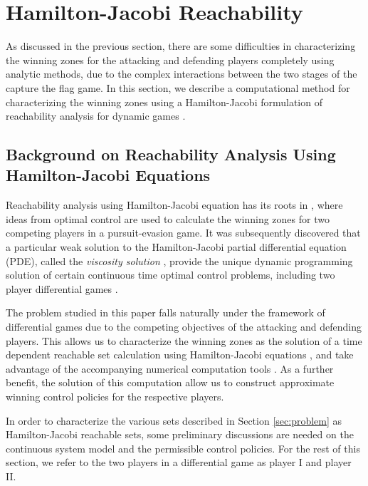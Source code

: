\section{Hamilton-Jacobi Reachability}
\label{sec:hj_formulation}

As discussed in the previous section, there are some difficulties in characterizing the winning zones for the attacking and defending players completely using analytic methods, due to the complex interactions between the two stages of the capture the flag game.  In this section, we describe a computational method for characterizing the winning zones using a Hamilton-Jacobi formulation of reachability analysis for dynamic games \cite{j:mitchell-TAC-2005}.

\subsection{Background on Reachability Analysis Using Hamilton-Jacobi Equations}
\label{subsec:hj_background}

Reachability analysis using Hamilton-Jacobi equation has its roots in \cite{b:isaacs-1967}, where ideas from optimal control are used to calculate the winning zones for two competing players in a pursuit-evasion game.  It was subsequently discovered that a particular weak solution to the Hamilton-Jacobi partial differential equation (PDE), called the \emph{viscosity solution} \cite{j:Crandall-TAMS-1983}, provide the unique dynamic programming solution of certain continuous time optimal control problems, including two player differential games \cite{j:Evans-IUMJ-1984,b:bardi-1997}.  

The problem studied in this paper falls naturally under the framework of differential games due to the competing objectives of the attacking and defending players.  This allows us to characterize the winning zones as the solution of a time dependent reachable set calculation using Hamilton-Jacobi equations \cite{j:mitchell-TAC-2005}, and take advantage of the accompanying numerical computation tools \cite{j:mitchell-jsc-2008}.  As a further benefit, the solution of this computation allow us to construct approximate winning control policies for the respective players.

In order to characterize the various sets described in Section \ref{sec:problem} as Hamilton-Jacobi reachable sets, some preliminary discussions are needed on the continuous system model and the permissible control policies.  For the rest of this section, we refer to the two players in a differential game as player I and player II.

